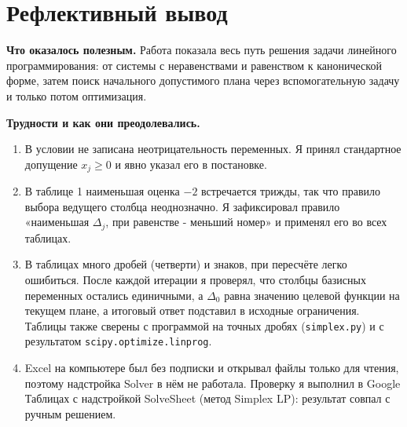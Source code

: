 \documentclass[a4paper,12pt]{article}
\begin{document}
\section{Рефлективный вывод}

\textbf{Что оказалось полезным.} Работа показала весь путь решения задачи линейного программирования: от системы с неравенствами и равенством к канонической форме, затем поиск начального допустимого плана через вспомогательную задачу и только потом оптимизация.

\textbf{Трудности и как они преодолевались.}
\begin{enumerate}
\item В условии не записана неотрицательность переменных. Я принял стандартное допущение $x_j \ge 0$ и явно указал его в постановке.
\item В таблице 1 наименьшая оценка $-2$ встречается трижды, так что правило выбора ведущего столбца неоднозначно. Я зафиксировал правило «наименьшая $\Delta_j$, при равенстве - меньший номер» и применял его во всех таблицах.
\item В таблицах много дробей (четверти) и знаков, при пересчёте легко ошибиться. После каждой итерации я проверял, что столбцы базисных переменных остались единичными, а $\Delta_0$ равна значению целевой функции на текущем плане, а итоговый ответ подставил в исходные ограничения. Таблицы также сверены с программой на точных дробях (\texttt{simplex.py}) и с результатом \texttt{scipy.optimize.linprog}.
\item Excel на компьютере был без подписки и открывал файлы только для чтения, поэтому надстройка Solver в нём не работала. Проверку я выполнил в Google Таблицах с надстройкой SolveSheet (метод Simplex LP): результат совпал с ручным решением.
\end{enumerate}
\end{document}
